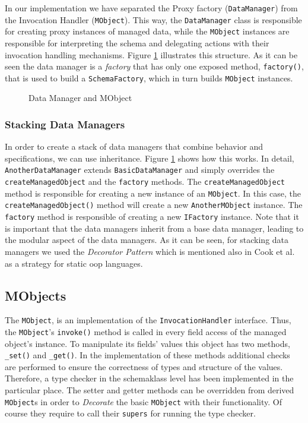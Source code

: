 In our implementation we have separated the Proxy factory (\texttt{DataManager}) from the Invocation Handler (\texttt{MObject}).
This way, the \texttt{DataManager} class is responsible for creating proxy instances of managed data, while the \texttt{MObject} instances are responsible for interpreting the schema and delegating actions with their invocation handling mechanisms. 
Figure \ref{fig:DataManager_and_MObject} illustrates this structure.
As it can be seen the data manager is a \textit{factory} that has only one exposed method, \texttt{factory()}, that is used to build a \texttt{SchemaFactory}, which in turn builds \texttt{MObject} instances.

\begin{figure}[H]
	\centering
  	\caption{Data Manager and MObject}
  	\label{fig:DataManager_and_MObject}
\end{figure}

\subsubsection{Stacking Data Managers}
In order to create a stack of data managers that combine behavior and specifications, we can use inheritance.
Figure \ref{fig:DataManager_and_MObject} shows how this works.
In detail, \texttt{AnotherDataManager} extends \texttt{BasicDataManager} and simply overrides the \texttt{createManagedObject} and the \texttt{factory} methods.
The \texttt{createManagedObject} method is responsible for creating a new instance of an \texttt{MObject}.
In this case, the \texttt{createManagedObject()} method will create a new \texttt{AnotherMObject} instance.
The \texttt{factory} method is responsible of creating a new \texttt{IFactory} instance.
Note that it is important that the data managers inherit from a base data manager, leading to the modular aspect of the data managers.
As it can be seen, for stacking data managers we used the \textit{Decorator Pattern} \cite{gamma1995design} which is mentioned also in Cook et al. \cite{loh2012managed} as a strategy for static \ac{oop} languages.

\subsection{MObjects}\label{sec:Managed Objects}
The \texttt{MObject}, is an implementation of the \texttt{InvocationHandler} interface.
Thus, the \texttt{MObject}'s \texttt{invoke()} method is called in every field access of the managed object's instance.
To manipulate its fields' values this object has two methods, \texttt{\_set()} and \texttt{\_get()}.
In the implementation of these methods additional checks are performed to ensure the correctness of types and structure of the values.
Therefore, a type checker in the schemaklass level has been implemented in the particular place.
The setter and getter methods can be overridden from derived \texttt{MObject}s in order to \textit{Decorate} the basic \texttt{MObject} with their functionality. 
Of course they require to call their \texttt{supers} for running the type checker.

